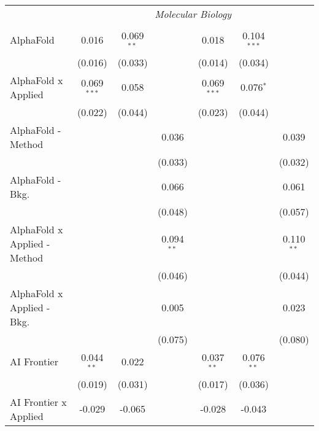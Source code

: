 \begin{tabular}{lcccccc}
 & \multicolumn{6}{c}{\textit{Molecular Biology}} \\ \\
   AlphaFold                      & 0.016         & 0.069$^{**}$ &              & 0.018         & 0.104$^{***}$ &   \\   
                                  & (0.016)       & (0.033)      &              & (0.014)       & (0.034)       &   \\   
   AlphaFold x Applied            & 0.069$^{***}$ & 0.058        &              & 0.069$^{***}$ & 0.076$^{*}$   &   \\   
                                  & (0.022)       & (0.044)      &              & (0.023)       & (0.044)       &   \\   
   AlphaFold - Method             &               &              & 0.036        &               &               & 0.039\\   
                                  &               &              & (0.033)      &               &               & (0.032)\\   
   AlphaFold - Bkg.               &               &              & 0.066        &               &               & 0.061\\   
                                  &               &              & (0.048)      &               &               & (0.057)\\   
   AlphaFold x Applied - Method   &               &              & 0.094$^{**}$ &               &               & 0.110$^{**}$\\   
                                  &               &              & (0.046)      &               &               & (0.044)\\   
   AlphaFold x Applied - Bkg.     &               &              & 0.005        &               &               & 0.023\\   
                                  &               &              & (0.075)      &               &               & (0.080)\\   
   AI Frontier                    & 0.044$^{**}$  & 0.022        &              & 0.037$^{**}$  & 0.076$^{**}$  &   \\   
                                  & (0.019)       & (0.031)      &              & (0.017)       & (0.036)       &   \\   
   AI Frontier x Applied          & -0.029        & -0.065       &              & -0.028        & -0.043        &   \\   

\end{tabular}

